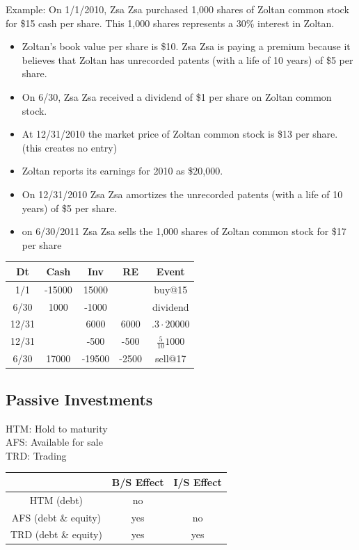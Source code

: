 Example: On 1/1/2010, Zsa Zsa purchased 1,000 shares of Zoltan common stock for \$15
cash per share. This 1,000 shares represents a 30\% interest in Zoltan.
\begin{itemize}[noitemsep,topsep=0pt]
\item Zoltan’s book value per share is \$10. Zsa Zsa is paying a premium because it believes
that Zoltan has unrecorded patents (with a life of 10 years) of \$5 per share.
\item On 6/30, Zsa Zsa received a dividend of \$1 per share on Zoltan common stock.
\item At 12/31/2010 the market price of Zoltan common stock is \$13 per share. (this creates no entry)
\item Zoltan reports its earnings for 2010 as \$20,000.
\item On 12/31/2010 Zsa Zsa amortizes the unrecorded patents (with a life of 10 years) of \$5 per share.
\item on 6/30/2011 Zsa Zsa sells the 1,000 shares of Zoltan common stock for \$17 per share

\end{itemize} 

\newpage

	\begin{tabular}{ |c|c|c||c||c| } 
		\hline
		Dt &  Cash & Inv & RE & Event	 \\ 
		\hline
		1/1   & -15000 & 15000 & & buy@15\\
		6/30  & 1000    & -1000 & & dividend \\
		12/31 &         & 6000  & 6000 & $.3 \cdot 20000$\\ 
		12/31 &         & -500  & -500 & $\frac{5}{10}  1000$ \\    
		6/30 &   17000      & -19500  & -2500 & sell@17 \\      	
		\hline
	\end{tabular}



\subsection*{Passive Investments}

HTM: Hold to maturity \\
AFS: Available for sale \\
TRD: Trading \\

	\begin{tabular}{ |c|c|c| } 
		\hline
			  & B/S Effect & I/S Effect \\ 
		\hline
		HTM (debt) & no &  \\ 
		AFS (debt \& equity) & yes & no \\ 
		TRD (debt \& equity) & yes & yes \\ 
		\hline
	\end{tabular}

